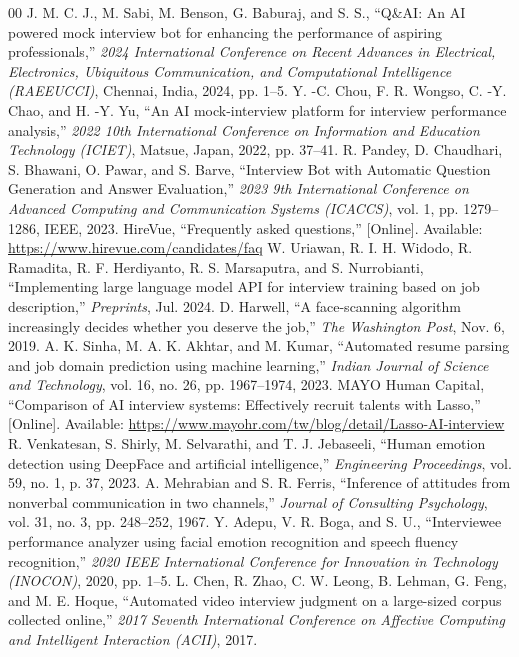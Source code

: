 \documentclass[conference]{IEEEtran}
\begin{document}
\begin{thebibliography}{00}
 J. M. C. J., M. Sabi, M. Benson, G. Baburaj, and S. S., ``Q\&AI: An AI powered mock interview bot for enhancing the performance of aspiring professionals,'' \textit{2024 International Conference on Recent Advances in Electrical, Electronics, Ubiquitous Communication, and Computational Intelligence (RAEEUCCI)}, Chennai, India, 2024, pp. 1--5.
 Y. -C. Chou, F. R. Wongso, C. -Y. Chao, and H. -Y. Yu, ``An AI mock-interview platform for interview performance analysis,'' \textit{2022 10th International Conference on Information and Education Technology (ICIET)}, Matsue, Japan, 2022, pp. 37--41.
 R. Pandey, D. Chaudhari, S. Bhawani, O. Pawar, and S. Barve, ``Interview Bot with Automatic Question Generation and Answer Evaluation,'' \textit{2023 9th International Conference on Advanced Computing and Communication Systems (ICACCS)}, vol. 1, pp. 1279--1286, IEEE, 2023.
 HireVue, ``Frequently asked questions,'' [Online]. Available: \url{https://www.hirevue.com/candidates/faq}
 W. Uriawan, R. I. H. Widodo, R. Ramadita, R. F. Herdiyanto, R. S. Marsaputra, and S. Nurrobianti, ``Implementing large language model API for interview training based on job description,'' \textit{Preprints}, Jul. 2024.
 D. Harwell, ``A face-scanning algorithm increasingly decides whether you deserve the job,'' \textit{The Washington Post}, Nov. 6, 2019.
 A. K. Sinha, M. A. K. Akhtar, and M. Kumar, ``Automated resume parsing and job domain prediction using machine learning,'' \textit{Indian Journal of Science and Technology}, vol. 16, no. 26, pp. 1967--1974, 2023.
 MAYO Human Capital, ``Comparison of AI interview systems: Effectively recruit talents with Lasso,'' [Online]. Available: \url{https://www.mayohr.com/tw/blog/detail/Lasso-AI-interview}
 R. Venkatesan, S. Shirly, M. Selvarathi, and T. J. Jebaseeli, ``Human emotion detection using DeepFace and artificial intelligence,'' \textit{Engineering Proceedings}, vol. 59, no. 1, p. 37, 2023.
 A. Mehrabian and S. R. Ferris, ``Inference of attitudes from nonverbal communication in two channels,'' \textit{Journal of Consulting Psychology}, vol. 31, no. 3, pp. 248--252, 1967.
 Y. Adepu, V. R. Boga, and S. U., ``Interviewee performance analyzer using facial emotion recognition and speech fluency recognition,'' \textit{2020 IEEE International Conference for Innovation in Technology (INOCON)}, 2020, pp. 1--5.
 L. Chen, R. Zhao, C. W. Leong, B. Lehman, G. Feng, and M. E. Hoque, ``Automated video interview judgment on a large-sized corpus collected online,'' \textit{2017 Seventh International Conference on Affective Computing and Intelligent Interaction (ACII)}, 2017.

\end{thebibliography}
\end{document}
